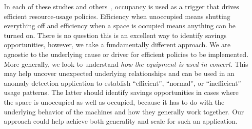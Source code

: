 
In each of these studies and others~\cite{AgarwalBDGW11, kaminthermo, buildanomaly}, occupancy is used as a trigger
that drives efficient resource-usage policies.  Efficiency
when unoccupied means shutting everything off and efficiency when a space is occupied means anything
can be turned on.  There is no question this is an excellent way to identify savings opportunities, however, we
take a fundamentally different approach.  We are agnostic to the underlying cause or driver for efficient
policies to be implemented.  More generally, we look to understand \emph{how the equipment is used in
concert}.  This may help uncover unexpected underlying relationships and can be used in an anomaly detection application
to establish ``efficient'', ``normal'', or ``inefficient'' usage patterns.  The latter 
should identify savings opportunities in cases where the space is unoccupied as well 
as occupied, because it has to do with the underlying behavior of the machines and how they generally work
together.  Our approach could help achieve both generality and scale for such an application.




